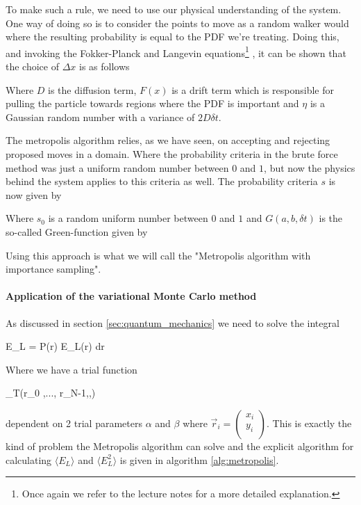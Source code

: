 To make such a rule, we need to use our physical understanding of the system. 
One way of doing so is to consider the points to move as a random walker would where the resulting probability is equal to the PDF we're treating.
Doing this, and invoking the Fokker-Planck and Langevin equations\footnote{Once again we refer to the lecture notes \cite{lecturenotes} for a more detailed explanation.}
, it can be shown that the choice of $\Delta x$ is as follows

\eqs
{}
\label{eq:importance_raw}
\eqf

Where $D$ is the diffusion term, $F(x)$ is a drift term which is responsible for pulling the particle towards regions where the PDF is important and $\eta$ is a Gaussian random number with a variance of $2D\delta t$.

The metropolis algorithm relies, as we have seen, on accepting and rejecting proposed moves in a domain. 
Where the probability criteria in the brute force method was just a uniform random number between $0$ and $1$, but now the physics behind the system applies to this criteria as well. 
The probability criteria $s$ is now given by 

\eqs
{}
\eqf

Where $s_0$ is a random uniform number between $0$ and $1$ and $G(a,b,\delta t)$ is the so-called Green-function given by 

\eqs
{}
\eqf

Using this approach is what we will call the "Metropolis algorithm with importance sampling".


\paragraph{Application of the variational Monte Carlo method}
As discussed in section \ref{sec:quantum_mechanics} we need to solve the integral 

\eqs \langle E_L \rangle = \int P(\vec r) E_L(\vec r) d\vec r \eqf

Where we have a trial function 

\eqs \Psi_T(\vec r_0 ,..., \vec r_{N-1},\alpha,\beta) \eqf

dependent on 2 trial parameters $\alpha$ and $\beta$
where $\vec r_i = \left ( \begin{matrix} x_i \\ y_i \\ \end{matrix} \right )$.
This is exactly the kind of problem the Metropolis algorithm can solve and the explicit algorithm for calculating $\langle E_L \rangle$ and $\langle E_L^2 \rangle$ is given in algorithm \ref{alg:metropolis}.

